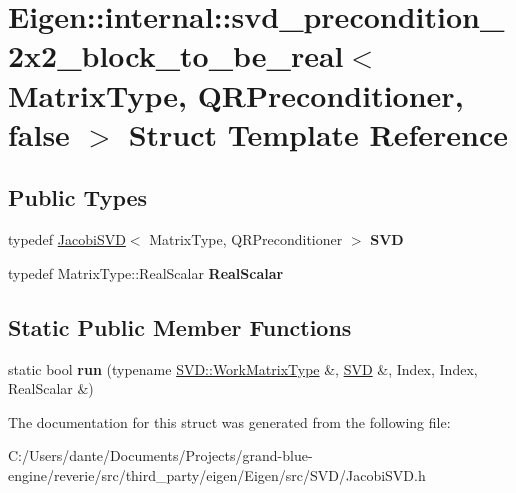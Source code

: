 \hypertarget{struct_eigen_1_1internal_1_1svd__precondition__2x2__block__to__be__real_3_01_matrix_type_00_01_q076cf26720930d18ea7d222bbee662fd}{}\section{Eigen\+::internal\+::svd\+\_\+precondition\+\_\+2x2\+\_\+block\+\_\+to\+\_\+be\+\_\+real$<$ Matrix\+Type, Q\+R\+Preconditioner, false $>$ Struct Template Reference}
\label{struct_eigen_1_1internal_1_1svd__precondition__2x2__block__to__be__real_3_01_matrix_type_00_01_q076cf26720930d18ea7d222bbee662fd}
\subsection*{Public Types}
\begin{DoxyCompactItemize}
\item 
\mbox{\label{struct_eigen_1_1internal_1_1svd__precondition__2x2__block__to__be__real_3_01_matrix_type_00_01_q076cf26720930d18ea7d222bbee662fd_a03f1047549bd0f97f40c2df3f4a14927}} 
typedef \mbox{\hyperlink{class_eigen_1_1_jacobi_s_v_d}{Jacobi\+S\+VD}}$<$ Matrix\+Type, Q\+R\+Preconditioner $>$ {\bfseries S\+VD}
\item 
\mbox{\label{struct_eigen_1_1internal_1_1svd__precondition__2x2__block__to__be__real_3_01_matrix_type_00_01_q076cf26720930d18ea7d222bbee662fd_a9256fcadaa3aa0e1ad3a5785dae44751}} 
typedef Matrix\+Type\+::\+Real\+Scalar {\bfseries Real\+Scalar}
\end{DoxyCompactItemize}
\subsection*{Static Public Member Functions}
\begin{DoxyCompactItemize}
\item 
\mbox{\label{struct_eigen_1_1internal_1_1svd__precondition__2x2__block__to__be__real_3_01_matrix_type_00_01_q076cf26720930d18ea7d222bbee662fd_afde3f70cb5d0cf4bf15c8df8a36372f9}} 
static bool {\bfseries run} (typename \mbox{\hyperlink{class_eigen_1_1_matrix}{S\+V\+D\+::\+Work\+Matrix\+Type}} \&, \mbox{\hyperlink{class_eigen_1_1_jacobi_s_v_d}{S\+VD}} \&, Index, Index, Real\+Scalar \&)
\end{DoxyCompactItemize}


The documentation for this struct was generated from the following file\+:\begin{DoxyCompactItemize}
\item 
C\+:/\+Users/dante/\+Documents/\+Projects/grand-\/blue-\/engine/reverie/src/third\+\_\+party/eigen/\+Eigen/src/\+S\+V\+D/Jacobi\+S\+V\+D.\+h\end{DoxyCompactItemize}

